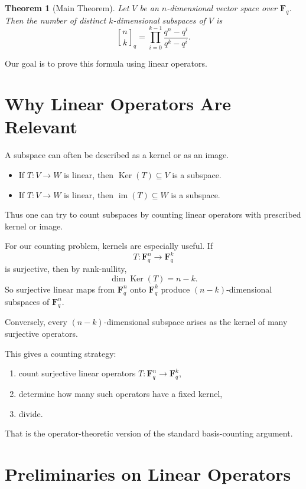 \documentclass[11pt]{article}
\newtheorem{theorem}{Theorem}[section]
\theoremstyle{definition}
\theoremstyle{remark}
\newcommand{\F}{\mathbf{F}}
\newcommand{\im}{\operatorname{im}}
\newcommand{\Ker}{\operatorname{Ker}}
\newcommand{\qbinom}[2]{\genfrac{[}{]}{0pt}{}{#1}{#2}_q}
\begin{document}
	\begin{theorem}[Main Theorem]
		Let \(V\) be an \(n\)-dimensional vector space over \(\F_q\). Then the number of distinct \(k\)-dimensional subspaces of \(V\) is
		\[
		\boxed{
			\qbinom{n}{k}
			=
			\prod_{i=0}^{k-1}\frac{q^n-q^i}{q^k-q^i}
		}.
		\]
	\end{theorem}
	
	Our goal is to prove this formula using linear operators.
	
	\section{Why Linear Operators Are Relevant}
	
	A subspace can often be described as a kernel or as an image.
	
	\begin{itemize}
		\item If \(T:V\to W\) is linear, then \(\Ker(T)\subseteq V\) is a subspace.
		\item If \(T:V\to W\) is linear, then \(\im(T)\subseteq W\) is a subspace.
	\end{itemize}
	
	Thus one can try to count subspaces by counting linear operators with prescribed kernel or image.
	
	For our counting problem, kernels are especially useful. If
	\[
	T:\F_q^n\to \F_q^k
	\]
	is surjective, then by rank-nullity,
	\[
	\dim\Ker(T)=n-k.
	\]
	So surjective linear maps from \(\F_q^n\) onto \(\F_q^k\) produce \((n-k)\)-dimensional subspaces of \(\F_q^n\).
	
	Conversely, every \((n-k)\)-dimensional subspace arises as the kernel of many surjective operators.
	
	This gives a counting strategy:
	\begin{enumerate}[label=\arabic*.]
		\item count surjective linear operators \(T:\F_q^n\to \F_q^k\),
		\item determine how many such operators have a fixed kernel,
		\item divide.
	\end{enumerate}
	
	That is the operator-theoretic version of the standard basis-counting argument.
	
	\section{Preliminaries on Linear Operators}
	
\end{document}

